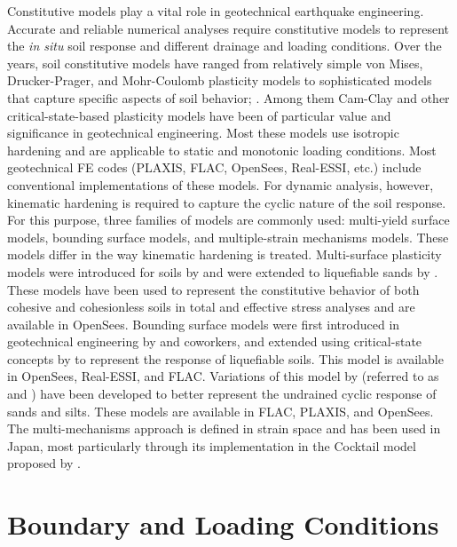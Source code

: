 Constitutive models play a vital role in geotechnical earthquake engineering. Accurate and reliable numerical analyses require constitutive models to represent the \textit{in situ} soil response and different drainage and loading conditions. Over the years, soil constitutive models  have ranged from relatively simple von Mises, Drucker-Prager, and Mohr-Coulomb plasticity models to sophisticated models that capture specific aspects of soil behavior; \cite[see][]{Borja2013}. Among them Cam-Clay and other critical-state-based plasticity models have been of particular value and significance in geotechnical engineering. Most these models use isotropic hardening and are applicable to static and monotonic loading conditions. Most geotechnical FE codes (PLAXIS, FLAC, OpenSees, Real-ESSI, etc.) include conventional implementations of these models. For dynamic analysis, however, kinematic hardening is required to capture the cyclic nature of the soil response. For this purpose, three families of models are commonly used: multi-yield surface models, bounding surface models, and multiple-strain mechanisms models. These models differ in the way kinematic hardening is treated. Multi-surface plasticity models were introduced for soils by \citet{Prevost77, Prevost85a} and were extended to liquefiable sands by \citet{Elgamal03}. These models have been used to represent the constitutive behavior of both cohesive and cohesionless soils in total and effective stress analyses and are available in OpenSees. Bounding surface models were first introduced in geotechnical engineering by \citet{Dafalias86} and coworkers, and extended using critical-state concepts by \citet{Dafalias04} to represent the response of liquefiable soils. This model is available in OpenSees, Real-ESSI, and FLAC. Variations of this model by \citet{boulanger2017pm4sand, boulanger2018pm4silt} (referred to as  and ) have been developed to better represent the undrained cyclic response of sands and silts. These models are available in FLAC, PLAXIS, and OpenSees. The multi-mechanisms approach is defined in strain space and has been used in Japan, most particularly through its implementation in the Cocktail model proposed by \citet{iai2011dilatancy,iai2013finite}.

\section{Boundary and Loading Conditions}
\label{sec:resp_geotech_5}

